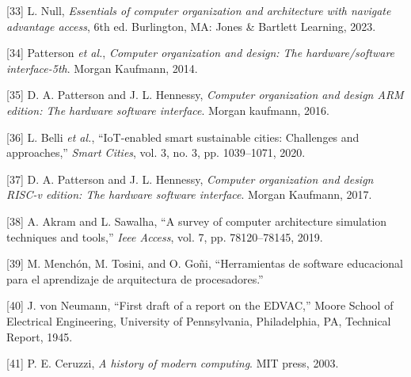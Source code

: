 \documentclass[12pt,oneside]{templates/unerthesis}
\newcommand{\CSLLeftMargin}[1]{#1} %
\newcommand{\CSLRightInline}[1]{#1} %
\newlength{\cslhangindent}
\newenvironment{CSLReferences}[2] %
 {\setlength{\parindent}{0pt}%
  \setlength{\leftskip}{#1 pt\relax}%
  \setlength{\parskip}{#2 pt\relax}%
  \everypar{\setlength{\hangindent}{\cslhangindent}}}
 {\par}
\begin{document}
\begin{CSLReferences}{0}{0}
\leavevmode{}%
\CSLLeftMargin{{[}33{]} }%
\CSLRightInline{L. Null, \emph{Essentials of computer organization and architecture with navigate advantage access}, 6th ed. Burlington, MA: Jones \& Bartlett Learning, 2023.}

\leavevmode{}%
\CSLLeftMargin{{[}34{]} }%
\CSLRightInline{Patterson \emph{et al.}, \emph{Computer organization and design: The hardware/software interface-5th}. Morgan Kaufmann, 2014.}

\leavevmode{}%
\CSLLeftMargin{{[}35{]} }%
\CSLRightInline{D. A. Patterson and J. L. Hennessy, \emph{Computer organization and design ARM edition: The hardware software interface}. Morgan kaufmann, 2016.}

\leavevmode{}%
\CSLLeftMargin{{[}36{]} }%
\CSLRightInline{L. Belli \emph{et al.}, {``IoT-enabled smart sustainable cities: Challenges and approaches,''} \emph{Smart Cities}, vol. 3, no. 3, pp. 1039--1071, 2020.}

\leavevmode{}%
\CSLLeftMargin{{[}37{]} }%
\CSLRightInline{D. A. Patterson and J. L. Hennessy, \emph{Computer organization and design RISC-v edition: The hardware software interface}. Morgan Kaufmann, 2017.}

\leavevmode{}%
\CSLLeftMargin{{[}38{]} }%
\CSLRightInline{A. Akram and L. Sawalha, {``A survey of computer architecture simulation techniques and tools,''} \emph{Ieee Access}, vol. 7, pp. 78120--78145, 2019.}

\leavevmode{}%
\CSLLeftMargin{{[}39{]} }%
\CSLRightInline{M. Menchón, M. Tosini, and O. Goñi, {``Herramientas de software educacional para el aprendizaje de arquitectura de procesadores.''}}

\leavevmode{}%
\CSLLeftMargin{{[}40{]} }%
\CSLRightInline{J. von Neumann, {``First draft of a report on the {EDVAC},''} Moore School of Electrical Engineering, University of Pennsylvania, Philadelphia, PA, Technical Report, 1945.}

\leavevmode{}%
\CSLLeftMargin{{[}41{]} }%
\CSLRightInline{P. E. Ceruzzi, \emph{A history of modern computing}. MIT press, 2003.}


\end{CSLReferences}
\end{document}
